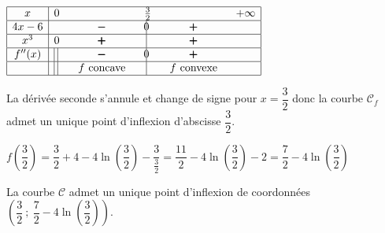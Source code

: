 \begin{enumerate}
\begin{center}
\renewcommand{\arraystretch}{1.5}
\def\esp{\hspace*{2cm}}
$\begin{array}{|c | l *{4}{c} |} 
\hline
x  & 0 & \esp & \frac{3}{2} & \esp  & +\infty \\
\hline
4x-6 &  & \pmb{-} &  \vline\hspace{-2.7pt}{0} & \pmb{+} &    \\
\hline
x^3 &0  & \pmb{+} &  \vline\hspace{-2.7pt}{\phantom 0} & \pmb{+} &    \\
\hline
f''(x) &\vline\;\vline  & \pmb{-} &  \vline\hspace{-2.7pt}{0} & \pmb{+} &    \\
\hline
 &\vline\;\vline  & f \text{ concave} &  \vline\hspace{-2.7pt}{\phantom0} & f \text{ convexe} &    \\
\hline
\end{array}$
\renewcommand{\arraystretch}{1}
\end{center}

La dérivée seconde s'annule et change de signe pour $x=\dfrac{3}{2}$ donc la courbe $\mathcal{C}_f$ admet un unique point d'inflexion d'abscisse $\dfrac{3}{2}$.

$f\left (\dfrac{3}{2}\right) = \dfrac{3}{2} +4 -4\ln\left (\dfrac{3}{2}\right ) -\dfrac{3}{\frac{3}{2}}
= \dfrac{11}{2} -4\ln\left (\dfrac{3}{2}\right ) -2
= \dfrac{7}{2} -4\ln\left (\dfrac{3}{2}\right ) $

La courbe $\mathcal{C}$ admet un unique point d'inflexion de coordonnées
$\left ( \dfrac{3}{2}~;~\dfrac{7}{2} -4\ln\left (\dfrac{3}{2}\right )\right )$.
 
\end{enumerate}
